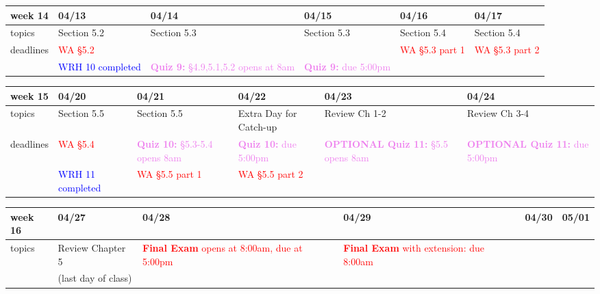 \documentclass[11pt]{article}
\begin{document}
\begin{center}
\begin{tabularx}{\textwidth}{|p{1.5cm}|| L | L | L | L | L |}
\hline
week 14&04/13&04/14&04/15&04/16&04/17\\ \hline
topics &Section 5.2&Section 5.3&Section 5.3&Section 5.4&Section 5.4\\  \hline
deadlines&\textcolor{red}{WA \S 5.2}  &&&\textcolor{red}{WA \S 5.3 part 1}&\textcolor{red}{WA \S5.3 part 2} \\ 
&\textcolor{blue}{WRH 10 completed}&\textcolor{violet}{\textbf{Quiz 9:} \S4.9,5.1,5.2 opens at 8am }&\textcolor{violet}{\textbf{Quiz 9:} due 5:00pm}&&\\ \hline \end{tabularx} \end{center}

\begin{center}
\begin{tabularx}{\textwidth}{|p{1.5cm}|| L | L | L | L | L |}
\hline
week 15&04/20&04/21&04/22&04/23&04/24\\ \hline
topics&Section 5.5&Section 5.5&Extra Day for Catch-up&Review Ch 1-2&Review Ch 3-4\\ \hline
deadlines&\textcolor{red}{WA \S 5.4} &\textcolor{violet}{\textbf{Quiz 10:} \S 5.3-5.4 opens 8am }&\textcolor{violet}{\textbf{Quiz 10:} due 5:00pm}&\textcolor{violet}{\textbf{OPTIONAL Quiz 11:} \S 5.5 opens 8am }&\textcolor{violet}{\textbf{OPTIONAL Quiz 11:} due 5:00pm}\\ 
&\textcolor{blue}{WRH 11 completed}&\textcolor{red}{WA \S 5.5 part 1}&\textcolor{red}{WA \S 5.5 part 2}&& \\ \hline \end{tabularx} \end{center}

\begin{center}
\begin{tabularx}{\textwidth}{|p{1.5cm}|| L | L | L | L | L |}
\hline
week 16&04/27&04/28&04/29&04/30&05/01\\ \hline
topics&Review Chapter 5&\textcolor{red}{\textbf{Final Exam} opens at 8:00am, due at 5:00pm} &\textcolor{red}{\textbf{Final Exam} with extension: due 8:00am}&&\\ 
&(last day of class)&&&&\\ \hline \hline
\end{tabularx} \end{center}
\end{document}
